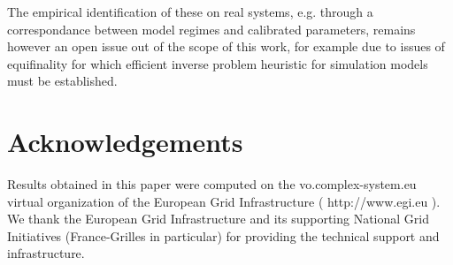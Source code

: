 \documentclass[11pt]{article}
\begin{document}
The empirical identification of these on real systems, e.g. through a correspondance between model regimes and calibrated parameters, remains however an open issue out of the scope of this work, for example due to issues of equifinality for which efficient inverse problem heuristic for simulation models must be established.






\section*{Acknowledgements}

Results obtained in this paper were computed on the vo.complex-system.eu virtual organization of the European Grid Infrastructure ( http://www.egi.eu ). We thank the European Grid Infrastructure and its supporting National Grid Initiatives (France-Grilles in particular) for providing the technical support and infrastructure.









\end{document}
